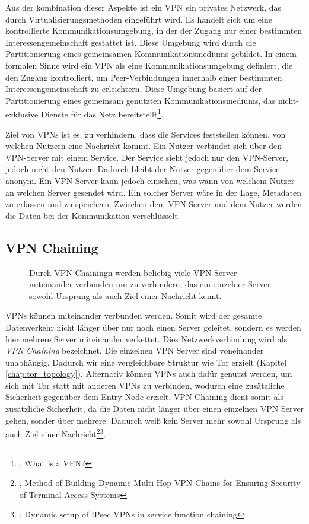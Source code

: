 Aus der kombination dieser Aspekte ist ein VPN ein privates Netzwerk, das durch Virtualisierungsmethoden eingeführt wird. Es handelt sich um eine kontrollierte Kommunikationsumgebung, in der der Zugang nur einer bestimmten Interessengemeinschaft gestattet ist. Diese Umgebung wird durch die Partitionierung eines gemeinsamen Kommunikationsmediums gebildet.
In einem formalen Sinne wird ein VPN als eine Kommunikationsumgebung definiert, die den Zugang kontrolliert, um Peer-Verbindungen innerhalb einer bestimmten Interessengemeinschaft zu erleichtern. Diese Umgebung basiert auf der Partitionierung eines gemeinsam genutzten Kommunikationsmediums, das nicht-exklusive Dienste für das Netz bereitstellt\footnote{\cite{DefinitionOfVPN}, What is a VPN?}.

Ziel von VPNs ist es, zu verhindern, dass die Services feststellen können, von welchen Nutzern eine Nachricht kommt. Ein Nutzer verbindet sich über den VPN-Server mit einem Service. Der Service sieht jedoch nur den VPN-Server, jedoch nicht den Nutzer. Dadurch bleibt der Nutzer gegenüber dem Service anonym.
Ein VPN-Server kann jedoch einsehen, was wann von welchem Nutzer an welchen Server gesendet wird. Ein solcher Server wäre in der Lage, Metadaten zu erfassen und zu speichern. Zwischen dem VPN Server und dem Nutzer werden die Daten bei der Kommunikation verschlüsselt.

\subsection{VPN Chaining}
\label{chap:vpn_chaining}

\begin{figure}[!h]
    \centering
    
    \caption{Durch VPN Chainingn werden beliebig viele VPN Server miteinander verbunden um zu verhindern, das ein einzelner Server sowohl Ursprung als auch Ziel einer Nachricht kennt.}
    \label{imgs:vpn_chaining}
\end{figure}

VPNs können miteinander verbunden werden. Somit wird der gesamte Datenverkehr nicht länger über nur noch einen Server geleitet, sondern es werden hier mehrere Server miteinander verkettet. Dies Netzwerkverbindung wird als \textit{VPN Chaining} bezeichnet. Die einzelnen VPN Server sind voneinander unabhängig. Dadurch wir eine vergleichbare Struktur wie Tor erzielt (Kapitel \ref{chap:tor_topology}). Alternativ können VPNs auch dafür genutzt werden, um sich mit Tor statt mit anderen VPNs zu verbinden, wodurch eine zusätzliche Sicherheit gegenüber dem Entry Node erzielt. VPN Chaining dient somit als zusätzliche Sicherheit, da die Daten nicht länger über einen einzelnen VPN Server gehen, sonder über mehrere. Dadurch weiß kein Server mehr sowohl Ursprung als auch Ziel einer Nachricht\footnote{\cite{VPNChains}, Method of Building Dynamic Multi-Hop VPN Chains for Ensuring Security of Terminal Access Systems}\footnote{\cite{SetupOfVPNChaining}, Dynamic setup of IPsec VPNs in service function chaining}.

